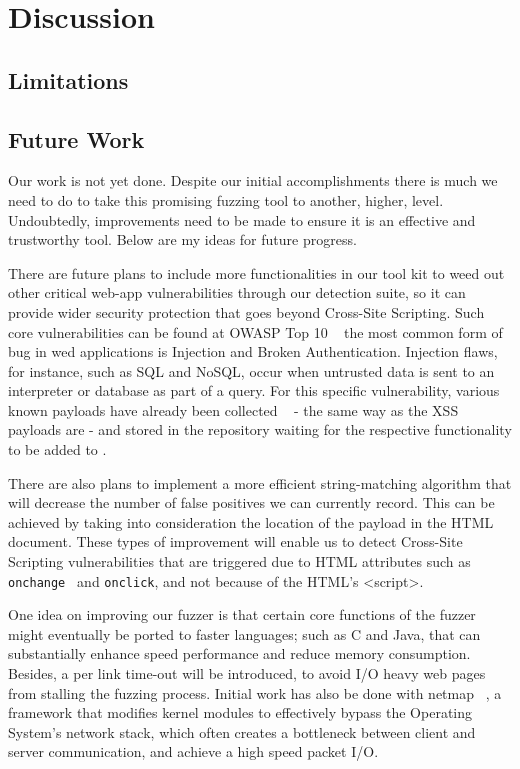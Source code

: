 \chapter{Discussion}
\label{sec:discussion}
\minitoc
\vspace*{1cm}

\section{Limitations}

\section{Future Work}

Our work is not yet done. Despite our initial accomplishments there is much we need to do to take this promising fuzzing tool to another, higher, level. Undoubtedly, improvements need to be made to ensure it is an effective and trustworthy tool. Below are my ideas for future progress.

There are future plans to include more functionalities in our tool kit to weed out other critical web-app vulnerabilities through our detection suite, so it can provide wider security protection that goes beyond Cross-Site Scripting. Such core vulnerabilities can be found at OWASP Top 10 ~\cite{owasp2017} the most common form of bug in wed applications is Injection and Broken Authentication. Injection flaws, for instance, such as SQL and NoSQL, occur when untrusted data is sent to an interpreter or database as part of a query. For this specific vulnerability, various known payloads have already been collected ~\cite{seclist} - the same way as the XSS payloads are - and stored in the repository waiting for the respective functionality to be added to \pname{}.

There are also plans to implement a more efficient string-matching algorithm that will decrease the number of false positives we can currently record. This can be achieved by taking into consideration the location of the payload in the HTML document. These types of improvement will enable us to detect Cross-Site Scripting vulnerabilities that are triggered due to HTML attributes such as {\tt onchange } and {\tt onclick}, and not because of the HTML's <script>.

One idea on improving our fuzzer is that certain core functions of the
fuzzer might eventually be ported to faster languages; such as C and Java, that can substantially enhance speed performance and reduce memory consumption. Besides, a per link time-out will be introduced, to avoid I/O heavy web pages from stalling the fuzzing process. Initial work has also be done with netmap  ~\cite{rizzo2011Netmap}, a framework that modifies kernel modules to effectively bypass the Operating System's network stack, which often creates a bottleneck between client and server communication, and achieve a high speed packet I/O.

